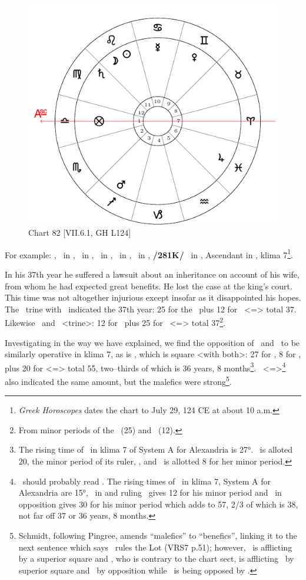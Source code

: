 \begin{figure}
\centering
\vspace{-10pt}
\includegraphics[width=.68\textwidth]{charts/7_6_01}
\caption{Chart 82 [VII.6.1, GH L124]}
\label{fig:chart82}
\end{figure} 

For example: \Sun, \Moon\, in \Leo, \Saturn\, in \Virgo, \Jupiter\, in \Pisces, \Mars\, in \Sagittarius, \Venus\, in \Gemini, \textbf{/281K/} \Mercury\, in \Cancer, Ascendant in \Libra, klima 7\footnote{\textit{Greek Horoscopes} dates the chart to July 29, 124 CE at about 10 a.m.}. 

In his 37th year he suffered a lawsuit about an inheritance on account of his wife, from whom he had expected great benefits. He lost the case at the king’s court. This time was not altogether injurious except insofar as it disappointed his hopes. The \Moon\, trine with \Mars\, indicated the 37th year: 25 for the \Moon\, plus 12 for \Sagittarius\, <=\Jupiter> total 37. Likewise \Jupiter\, and \Mercury\, <trine>: 12 for \Jupiter\, plus 25 for \Cancer\, <=\Moon> total 37\footnote{From minor periods of the \Moon\, (25) and \Jupiter\, (12).}. 

Investigating in the way we have explained, we find the opposition of \Mars\, and \Venus\, to be similarly operative in klima
7, as is \Saturn, which is square <with both>: 27 for \Gemini, 8 for \Venus, plus 20 for \Virgo <=\Mercury> total 55, two--thirds of which is 36 years, 8 months\footnote{The rising time of \Gemini\, in klima 7 of System A for Alexandria is 27°. \Virgo\, is alloted 20, the minor period of its ruler, \Mercury, and \Venus\, is allotted 8 for her minor period.}. \Pisces\, <=\Saturn>\footnote{\Saturn\, should probably read \Jupiter. The rising times of \Pisces\, in klima 7, System A for Alexandria are 15°, \Jupiter\, in and ruling \Pisces\, gives 12 for his minor period and \Saturn\, in opposition gives 30 for his minor period which adds to 57, 2/3 of which is 38, not far off 37 or 36 years, 8 months.} also indicated the same amount, but the malefics were strong\footnote{Schmidt, following Pingree, amends ``malefics'' to ``benefics'', linking it to the next sentence which says \Venus\, rules the Lot (VRS7 p.51); however, \Saturn\, is afflicting \Mars\, by a superior square and \Mars, who is contrary to the chart sect, is afflicting \Jupiter\, by superior square and \Venus\, by opposition while \Jupiter\, is being opposed by \Saturn.}. 

